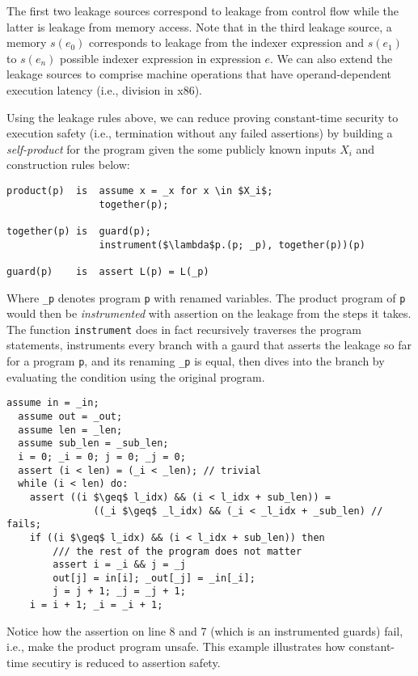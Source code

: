 The first two leakage sources correspond to leakage from control flow while the
latter is leakage from memory access. Note that in the third leakage source,
a memory $s(e_0)$ corresponds to leakage from the indexer expression and
$s(e_1)$ to $s(e_n)$ possible indexer expression in expression $e$. We can
also extend the leakage sources to comprise machine operations that have
operand-dependent execution latency (i.e., division in x86).

Using the leakage rules above, we can reduce proving constant-time security to
execution safety (i.e., termination without any failed assertions) by building
a \emph{self-product} for the program given the some publicly known inputs $X_i$
and construction rules below:

\begin{lstlisting}[language=MySketch]
product(p)  is  assume x = _x for x \in $X_i$;
                together(p);

together(p) is  guard(p);
                instrument($\lambda$p.(p; _p), together(p))(p)

guard(p)    is  assert L(p) = L(_p)
\end{lstlisting}

Where \texttt{\_p} denotes program \texttt{p} with renamed variables. The
product program of \texttt{p} would then be \emph{instrumented} with
assertion on the leakage from the steps it takes. The function \texttt{instrument}
does in fact recursively traverses the program statements, instruments every
branch with a gaurd that asserts the leakage so far for a program \texttt{p}, and its
renaming \texttt{\_p} is equal, then dives into the branch by evaluating
the condition using the original program.

\begin{lstlisting}[language=MySketch]
  assume in = _in;
  assume out = _out;
  assume len = _len;
  assume sub_len = _sub_len;
  i = 0; _i = 0; j = 0; _j = 0;
  assert (i < len) = (_i < _len); // trivial
  while (i < len) do:
    assert ((i $\geq$ l_idx) && (i < l_idx + sub_len)) =
               ((_i $\geq$ _l_idx) && (_i < _l_idx + _sub_len) // fails;
    if ((i $\geq$ l_idx) && (i < l_idx + sub_len)) then
        /// the rest of the program does not matter
        assert i = _i && j = _j
        out[j] = in[i]; _out[_j] = _in[_i];
        j = j + 1; _j = _j + 1;
    i = i + 1; _i = _i + 1;
\end{lstlisting}

Notice how the assertion on line 8 and 7 (which is an instrumented guards) fail,
i.e., make the product program unsafe. This example illustrates how
constant-time secutiry is reduced to assertion safety.
